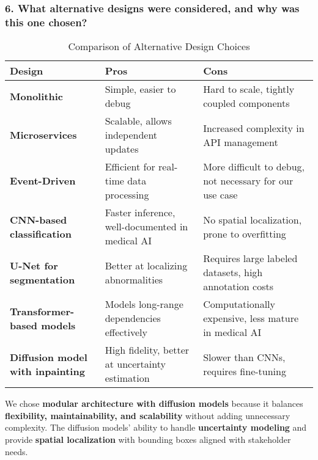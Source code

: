 \documentclass[12pt, titlepage]{article}
\begin{document}
\subsubsection{6. What alternative designs were considered, and why was this one chosen?}

\begin{table}[h!]
\centering
\begin{tabular}{|p{3cm}|p{5cm}|p{5cm}|}
    \hline
    \textbf{Design} & \textbf{Pros} & \textbf{Cons} \\
    \hline
    \textbf{Monolithic} & Simple, easier to debug & Hard to scale, tightly coupled components \\
    \hline
    \textbf{Microservices} & Scalable, allows independent updates & Increased complexity in API management \\
    \hline
    \textbf{Event-Driven} & Efficient for real-time data processing & More difficult to debug, not necessary for our use case \\
    \hline
    \textbf{CNN-based classification} & Faster inference, well-documented in medical AI & No spatial localization, prone to overfitting \\
    \hline
    \textbf{U-Net for segmentation} & Better at localizing abnormalities & Requires large labeled datasets, high annotation costs \\
    \hline
    \textbf{Transformer-based models} & Models long-range dependencies effectively & Computationally expensive, less mature in medical AI \\
    \hline
    \textbf{Diffusion model with inpainting} & High fidelity, better at uncertainty estimation & Slower than CNNs, requires fine-tuning \\
    \hline
\end{tabular}
\caption{Comparison of Alternative Design Choices}
\label{table:designComparison}
\end{table}

We chose \textbf{modular architecture with diffusion models} because it balances \textbf{flexibility, maintainability, and scalability} without adding unnecessary complexity. The diffusion models' ability to handle \textbf{uncertainty modeling} and provide \textbf{spatial localization} with bounding boxes aligned with stakeholder needs.
\end{document}
